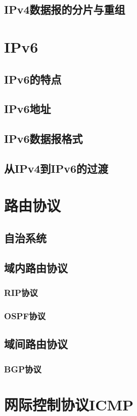 \documentclass[lang=cn,newtx,10pt,scheme=chinese]{../../elegantbook}
\begin{document}
\subsection{IPv4数据报的分片与重组}

\section{IPv6}
\subsection{IPv6的特点}
\subsection{IPv6地址}
\subsection{IPv6数据报格式}
\subsection{从IPv4到IPv6的过渡}

\section{路由协议}
\subsection{自治系统}
\subsection{域内路由协议}
\subsubsection{RIP协议}
\subsubsection{OSPF协议}
\subsection{域间路由协议}
\subsubsection{BGP协议}

\section{网际控制协议ICMP}
\end{document}
